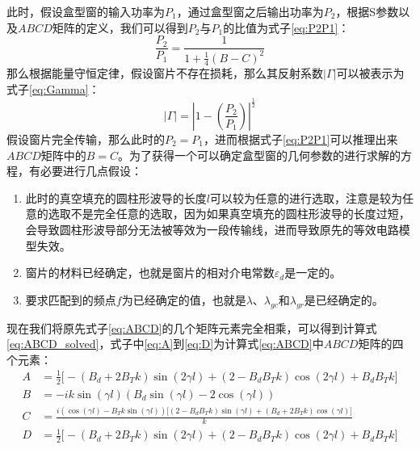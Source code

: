 \documentclass[master]{thesis-uestc}
\begin{document}
此时，假设盒型窗的输入功率为$P_{1}$，通过盒型窗之后输出功率为$P_{2}$，根据S参数以及$ABCD$矩阵的定义，我们可以得到$P_{2}$与$P_{1}$的比值为式子\ref{eq:P2P1}：
\begin{equation}\label{eq:P2P1}
    \frac{P_{2}}{P_{1}} = \frac{1}{1+\frac{1}{4} (B-C)^2}
\end{equation}
那么根据能量守恒定律，假设窗片不存在损耗，那么其反射系数$|\Gamma|$可以被表示为式子\ref{eq:Gamma}：
\begin{equation}\label{eq:Gamma}
    |\Gamma| = \left| 1 - \left( \frac{P_{2}}{P_{1}} \right) \right|^{\frac{1}{2}}
\end{equation}
假设窗片完全传输，那么此时的$P_{2}=P_{1}$，进而根据式子\ref{eq:P2P1}可以推理出来$ABCD$矩阵中的$B=C$。为了获得一个可以确定盒型窗的几何参数的进行求解的方程，有必要进行几点假设：
\begin{enumerate}
    \item 此时的真空填充的圆柱形波导的长度$l$可以较为任意的进行选取，注意是较为任意的选取不是完全任意的选取，因为如果真空填充的圆柱形波导的长度过短，会导致圆柱形波导部分无法被等效为一段传输线，进而导致原先的等效电路模型失效。
    \item 窗片的材料已经确定，也就是窗片的相对介电常数$\varepsilon_{d}$是一定的。
    \item 要求匹配到的频点$f$为已经确定的值，也就是$\lambda$、$\lambda_{gc}$和$\lambda_{gr}$是已经确定的。
\end{enumerate}


现在我们将原先式子\ref{eq:ABCD}的几个矩阵元素完全相乘，可以得到计算式\ref{eq:ABCD_solved}，式子中\ref{eq:A}到\ref{eq:D}为计算式\ref{eq:ABCD}中$ABCD$矩阵的四个元素：
\begin{subequations}\label{eq:ABCD_solved}
    \begin{align}
        A &= \frac{1}{2} \big[-(B_d + 2 B_T k) \sin(2\gamma l) + (2 - B_d B_T k)\cos(2\gamma l) + B_d B_T k \big] \label{eq:A} \\
        B &= -i k \sin(\gamma l) (B_d \sin(\gamma l) - 2 \cos(\gamma l)) \label{eq:B} \\
        C &= \frac{i (\cos(\gamma l) - B_T k \sin(\gamma l)) \big[(2 - B_d B_T k)\sin(\gamma l) + (B_d + 2 B_T k)\cos(\gamma l)\big]}{k} \label{eq:C} \\
        D &= \frac{1}{2} \big[-(B_d + 2 B_T k) \sin(2\gamma l) + (2 - B_d B_T k)\cos(2\gamma l) + B_d B_T k \big] \label{eq:D}
    \end{align}
\end{subequations}
\end{document}
